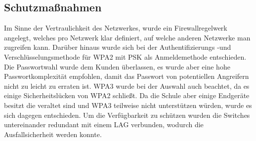 \begin{comment}
	\item Welcher Schutzbedarf  wird an die Anwendung gestellt (\zB hinsichtlich Sicherheit, Wichtigtkeit, ... \etc (siehe \citet{BSI-S-200-2}))?
\end{comment}

\subsection{Schutzmaßnahmen}
\label{sec:Schutzmaßnahmen}
Im Sinne der Vertraulichkeit des Netzwerkes, wurde ein Firewallregelwerk angelegt, welches pro Netzwerk klar definiert, auf welche anderen Netzwerke man zugreifen kann. Darüber hinaus wurde sich bei der Authentifizierungs -und Verschlüsselungsmethode für WPA2 mit \ac{PSK} als Anmeldemethode entschieden. Die Passwortwahl wurde dem Kunden überlassen, es wurde aber eine hohe Passwortkomplexität empfohlen, damit das Passwort von potentiellen Angreifern nicht zu leicht zu erraten ist. WPA3 wurde bei der Auswahl auch beachtet, da es einige Sicherheitslücken von WPA2  schließt. Da die Schule aber einige Endgeräte besitzt die veraltet sind und WPA3 teilweise nicht unterstützen würden, wurde es sich dagegen entschieden. Um die Verfügbarkeit zu schützen wurden die Switches untereinander redundant mit einem \ac{LAG} verbunden, wodurch die Ausfallsicherheit werden konnte.  
\begin{comment}
	\item Welche Schutznahmen werden unternommen um das System abzichern (\zB gegenüber fremden Zugriff, Sicherheitslücken, Updates, Ausfall des Systems \etc)?
\end{comment}
